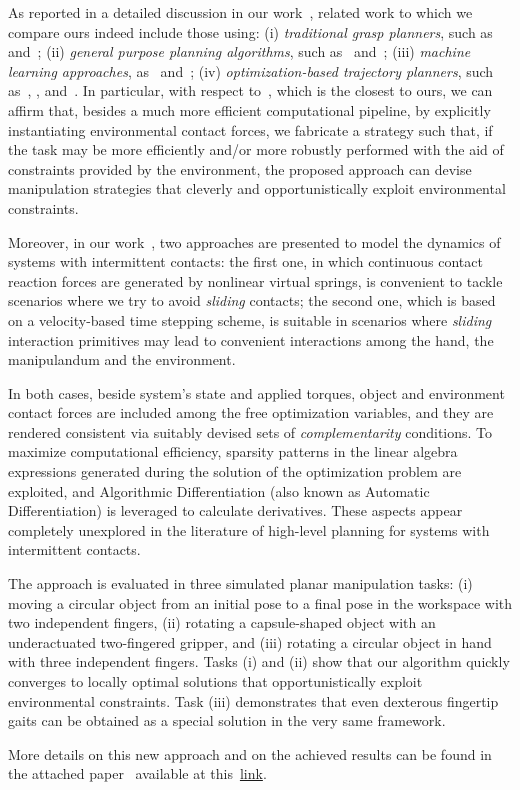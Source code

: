 As reported in a detailed discussion in our work~\cite{Gabiccini:RSS:2015}, related work to which we compare ours indeed include those using: (i) \emph{traditional grasp planners}, such as~\cite{Diankov:PHDTHESIS:2010} and~\cite{Miller:GRASPIT:2004}; (ii) \emph{general purpose planning algorithms}, such as~\cite{Koga:ICRA:1994} and~\cite{Cohen:RSS:2014}; (iii) \emph{machine learning approaches}, as~\cite{Levine:NIPS:2014} and~\cite{Levine:PREPRINT:2014}; (iv) \emph{optimization-based trajectory planners}, such as~\cite{Mordatch:ACMSCA:2012}, \cite{Mordatch:RSS:2014}, and~\cite{Posa:IJRR:2014}. In particular, with respect to~\cite{Posa:IJRR:2014}, which is the closest to ours, we can affirm that, besides a much more efficient computational pipeline, by explicitly instantiating environmental contact forces, we fabricate a strategy such that, if the task may be more efficiently and/or more robustly performed with the aid of constraints provided by the environment, the proposed approach can devise manipulation strategies that cleverly and opportunistically exploit environmental constraints.

 Moreover, in our work~\cite{Gabiccini:RSS:2015}, two approaches are presented to model the dynamics of systems with intermittent contacts: the first one, in which continuous contact reaction forces are generated  by nonlinear virtual springs, is convenient to tackle scenarios where we try to avoid \emph{sliding} contacts; the second one, which is based on a velocity-based time stepping scheme, is suitable in scenarios where \emph{sliding} interaction primitives may lead to convenient interactions among the hand, the manipulandum and the environment.

In both cases, beside system's state and applied torques, object and environment contact forces are included among the free optimization variables, and they are rendered consistent via suitably devised sets of \emph{complementarity} conditions. To maximize computational efficiency, sparsity patterns in the linear algebra expressions generated during the solution of the optimization problem are exploited, and Algorithmic Differentiation (also known as Automatic Differentiation) is leveraged to calculate derivatives. These aspects appear completely unexplored in the literature of high-level planning for systems with intermittent contacts.

The approach is evaluated in three simulated planar manipulation tasks: (i) moving a circular object from an initial pose to a final pose in the workspace with two independent fingers, (ii) rotating a capsule-shaped object with an underactuated two-fingered gripper, and (iii) rotating a circular object in hand with three independent fingers. Tasks (i) and (ii) show that our algorithm quickly converges to locally optimal solutions that opportunistically exploit environmental constraints. Task (iii) demonstrates that even dexterous fingertip gaits can be obtained as a special solution in the very same framework.

More details on this new approach and on the achieved results can be found in the attached paper~\cite{Gabiccini:RSS:2015} available at this~\href{./attachedPapers/ComputationalFrameworkEnvAwareRobManipPlanning.pdf}{link}. 